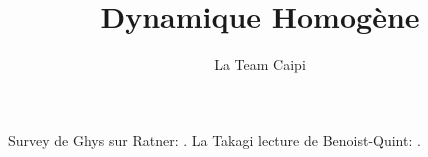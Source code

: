 \documentclass[12pt, a4paper,oneside]{amsart} %
\title{Dynamique Homogène}
\author{La Team Caipi}
\theoremstyle{definition}
\theoremstyle{remark}
\theoremstyle{remark}
\begin{document}
\maketitle


\tableofcontents

Survey de Ghys sur Ratner:
\cite{ghysDynamiqueFlotsUnipotentsa}.
La Takagi lecture de Benoist-Quint:
\cite{benoistIntroductionRandomWalks2012}.


\end{document}
